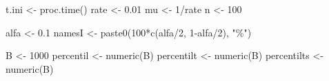 \documentclass[
]{book}
\newenvironment{Shaded}{\begin{snugshade}}{\end{snugshade}}
\newcommand{\DecValTok}[1]{\textcolor[rgb]{0.00,0.00,0.81}{#1}}
\newcommand{\FloatTok}[1]{\textcolor[rgb]{0.00,0.00,0.81}{#1}}
\newcommand{\FunctionTok}[1]{\textcolor[rgb]{0.00,0.00,0.00}{#1}}
\newcommand{\NormalTok}[1]{#1}
\newcommand{\OtherTok}[1]{\textcolor[rgb]{0.56,0.35,0.01}{#1}}
\newcommand{\SpecialCharTok}[1]{\textcolor[rgb]{0.00,0.00,0.00}{#1}}
\newcommand{\StringTok}[1]{\textcolor[rgb]{0.31,0.60,0.02}{#1}}
\theoremstyle{break}
\theoremstyle{definition}
\theoremstyle{definition}
\theoremstyle{definition}
\theoremstyle{definition}
\theoremstyle{remark}
\begin{document}
\begin{Shaded}
\begin{Highlighting}[]
\NormalTok{t.ini }\OtherTok{\textless{}{-}} \FunctionTok{proc.time}\NormalTok{()}
\NormalTok{rate }\OtherTok{\textless{}{-}} \FloatTok{0.01}
\NormalTok{mu }\OtherTok{\textless{}{-}} \DecValTok{1}\SpecialCharTok{/}\NormalTok{rate}
\NormalTok{n }\OtherTok{\textless{}{-}} \DecValTok{100}

\NormalTok{alfa }\OtherTok{\textless{}{-}} \FloatTok{0.1}
\NormalTok{namesI }\OtherTok{\textless{}{-}} \FunctionTok{paste0}\NormalTok{(}\DecValTok{100}\SpecialCharTok{*}\FunctionTok{c}\NormalTok{(alfa}\SpecialCharTok{/}\DecValTok{2}\NormalTok{, }\DecValTok{1}\SpecialCharTok{{-}}\NormalTok{alfa}\SpecialCharTok{/}\DecValTok{2}\NormalTok{), }\StringTok{"\%"}\NormalTok{)}

\NormalTok{B }\OtherTok{\textless{}{-}} \DecValTok{1000}
\NormalTok{percentil }\OtherTok{\textless{}{-}} \FunctionTok{numeric}\NormalTok{(B)}
\NormalTok{percentilt }\OtherTok{\textless{}{-}} \FunctionTok{numeric}\NormalTok{(B)}
\NormalTok{percentilts }\OtherTok{\textless{}{-}} \FunctionTok{numeric}\NormalTok{(B)}


\end{Highlighting}
\end{Shaded}
\end{document}
